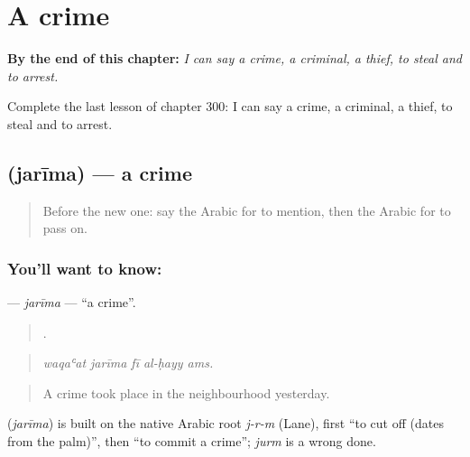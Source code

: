 
\chapter{A crime}
\label{ch:ar-a-crime}

\begin{chapteropening}
\textbf{By the end of this chapter:} \emph{I can say a crime, a criminal, a thief, to steal and to arrest.}

Complete the last lesson of chapter 300: I can say a crime, a criminal, a thief, to steal and to arrest.
\end{chapteropening}

\section[\texorpdfstring{\ar{جريمة} (jarīma)}{جريمة (jarīma)}]{ (jarīma) — a crime}

\label{lesson:AR-C300-jarima}



\begin{quote}
Before the new one: say the Arabic for to mention, then the Arabic for to pass on.
\end{quote}

\subsection*{You'll want to know: }
\textbf{} — \emph{jarīma} — \textquotedblleft{}a crime\textquotedblright{}.

\begin{quote}
    .
\end{quote}

\begin{quote}
\emph{waqaʿat jarīma fī al-ḥayy ams.}
\end{quote}

\begin{quote}
A crime took place in the neighbourhood yesterday.
\end{quote}

\begin{cousinweb}
\textbf{} (\emph{jarīma}) is built on the native Arabic root \emph{j-r-m} (Lane), first \textquotedblleft{}to cut off (dates from the palm)\textquotedblright{}, then \textquotedblleft{}to commit a crime\textquotedblright{}; \emph{jurm} is a wrong done.
\end{cousinweb}

